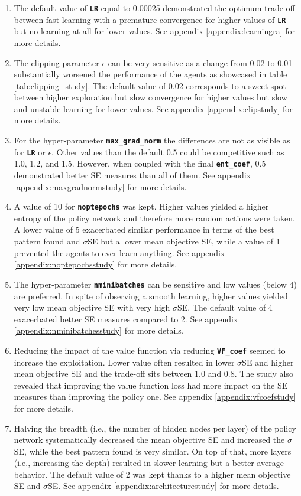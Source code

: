 \documentclass[a4paper]{article}
\newcommand{\code}[1]{\colorbox{light-gray}{\small\color{blue}\textbf{\texttt{#1}}}}
\begin{document}
\begin{enumerate}
    \item 
    The default value of \code{LR} equal to 0.00025 demonstrated the optimum trade-off between fast learning with a premature convergence for higher values of \code{LR} but no learning at all for lower values. See appendix \ref{appendix:learningra} for more details.
    \item
    The clipping parameter $\epsilon$ can be very sensitive as a change from 0.02 to 0.01 substantially worsened the performance of the agents as showcased in table \ref{tab:clipping_study}. The default value of 0.02 corresponds to a sweet spot between higher exploration but slow convergence for higher values but slow and unstable learning for lower values. See appendix \ref{appendix:clipstudy} for more details.
    \item
    For the hyper-parameter \code{max\_grad\_norm} the differences are not as visible as for \code{LR} or $\epsilon$. Other values than the default 0.5 could be competitive such as 1.0, 1.2, and 1.5. However, when coupled with the final \code{ent\_coef}, 0.5 demonstrated better SE measures than all of them. See appendix \ref{appendix:maxgradnormstudy} for more details.
    \item
    A value of 10 for \code{noptepochs} was kept. Higher values yielded a higher entropy of the policy network and therefore more random actions were taken. A lower value of 5 exacerbated similar performance in terms of the best pattern found and $\sigma$SE but a lower mean objective SE, while a value of 1 prevented the agents to ever learn anything. See appendix \ref{appendix:noptepochsstudy} for more details.
    \item
    The hyper-parameter \code{nminibatches} can be sensitive and low values (below 4) are preferred. In spite of observing a smooth learning, higher values yielded very low mean objective SE with very high $\sigma$SE. The default value of 4 exacerbated better SE measures compared to 2. See appendix \ref{appendix:nminibatchesstudy} for more details.
    \item
    Reducing the impact of the value function via reducing \code{VF\_coef} seemed to increase the exploitation. Lower value often resulted in lower $\sigma$SE and higher mean objective SE and the trade-off sits between 1.0 and 0.8. The study also revealed that improving the value function loss had more impact on the SE measures than improving the policy one. See appendix \ref{appendix:vfcoefstudy} for more details.
    \item
     Halving the breadth (i.e., the number of hidden nodes per layer) of the policy network systematically decreased the mean objective SE and increased the $\sigma$SE, while the best pattern found is very similar. On top of that, more layers (i.e., increasing the depth) resulted in slower learning but a better average behavior. The default value of 2 was kept thanks to a higher mean objective SE and $\sigma$SE. See appendix \ref{appendix:architecturestudy} for more details.
\end{enumerate}
\end{document}
